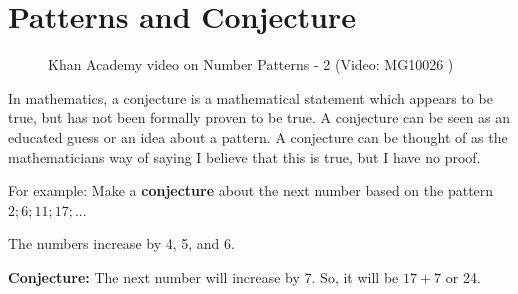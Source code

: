             \section{ Patterns and Conjecture}
            \nopagebreak
        \label{m39362*eip-362}
    \setcounter{subfigure}{0}
	\begin{figure}[H] %
    \textnormal{Khan Academy video on Number Patterns - 2}\vspace{.1in} \nopagebreak
  \label{m39362*yt-media2}\label{m39362*yt-video2}
             { (Video:  MG10026 )}
      \vspace{2pt}
    \vspace{.1in}
 \end{figure}       \par \label{m39362*id66036}In mathematics, a conjecture is a mathematical statement which appears to be true, but has not been formally proven to be true. A conjecture can be seen as an educated guess or an idea about a pattern. A conjecture can be thought of as the mathematicians way of saying I believe that this is true, but I have no proof.\par 
        \label{m39362*id66042}For example: Make a \textbf{conjecture} about the next number based on the pattern $2;6;11;17;...$\par 
        \label{m39362*id66085}The numbers increase by 4, 5, and 6.\par 
        \label{m39362*id66090}\textbf{Conjecture:} The next number will increase by 7. So, it will be $17+7$ or 24.\par 
\label{m39362*secfhsst!!!underscore!!!id1075}\vspace{.5cm} 
      \noindent
